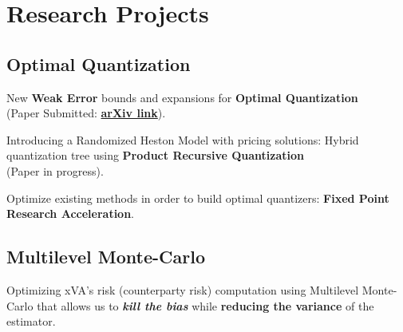 \documentclass[]{deedy-resume-openfont}
\begin{document}
%
%
\lastupdated

%
%

%
%

\begin{minipage}[t]{0.33\textwidth}



\section{Research Projects}

\subsection{Optimal Quantization}
\vspace{\topsep}
\begin{tightemize}
\item New \textbf{Weak Error} bounds and expansions for \textbf{Optimal Quantization} \\ (Paper Submitted: \href{https://arxiv.org/abs/1903.10330}{\textbf{arXiv link}}).
\item Introducing a Randomized Heston Model with pricing solutions: Hybrid quantization tree using \textbf{Product Recursive Quantization} \\ (Paper in progress).
\item Optimize existing methods in order to build optimal quantizers: \textbf{Fixed Point Research Acceleration}. 
\end{tightemize}
\sectionsep
\subsection{Multilevel Monte-Carlo}
\vspace{\topsep}
\begin{tightemize}
\item Optimizing xVA's risk (counterparty risk) computation using Multilevel Monte-Carlo that allows us to \textbf{\textit{kill the bias}} while \textbf{reducing the variance} of the estimator. 
\end{tightemize}





\end{minipage}
\end{document}
